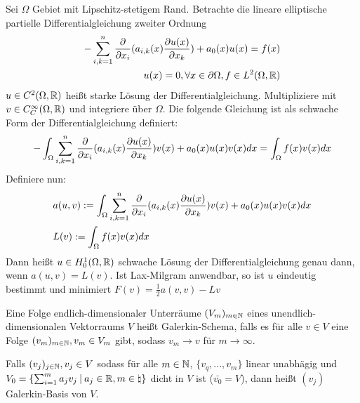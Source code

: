 \begin{satz}
	Sei $\Omega$ Gebiet mit Lipschitz-stetigem Rand. Betrachte die lineare elliptische partielle Differentialgleichung zweiter Ordnung
	\begin{align*}
		- \sum_{i,k = 1}^{n} \frac{\partial }{\partial x_i}(a_{i,k}(x) \frac{\partial u(x)}{\partial x_k}) + a_0(x)u(x) = f(x) \\
		u(x) = 0, \forall x \in \partial \Omega, f \in L^2(\Omega,\mathbb{R})
	\end{align*}
	$u \in C^{2}(\Omega,\mathbb{R})$ heißt starke Lösung der Differentialgleichung.
	Multipliziere mit $v \in C_C^\infty(\Omega,\mathbb{R})$ und integriere über $\Omega$. Die folgende Gleichung ist als schwache Form der Differentialgleichung definiert:
	\begin{align*}
		- \int_{\Omega} \sum_{i,k = 1}^{n} \frac{\partial }{\partial x_i}(a_{i,k}(x) \frac{\partial u(x)}{\partial x_k}) v(x) + a_0(x)u(x) v(x) dx = \int_\Omega f(x) v(x) dx
	\end{align*}
	Definiere nun:
	\begin{align*}
		&a(u,v) := \int_{\Omega} \sum_{i,k = 1}^{n} \frac{\partial }{\partial x_i}(a_{i,k}(x) \frac{\partial u(x)}{\partial x_k}) v(x) + a_0(x)u(x) v(x) dx \\
		&L(v) := \int_\Omega f(x)v(x) dx
	\end{align*}
	Dann heißt $u \in H^{1}_0(\Omega,\mathbb{R})$ schwache Lösung  der Differentialgleichung genau dann, wenn $a(u,v) = L(v)$. Ist Lax-Milgram anwendbar, so ist $u$ eindeutig bestimmt und minimiert $F(v) = \frac{1}{2} a(v,v) - Lv$
\end{satz}

\begin{definition}
	Eine Folge endlich-dimensionaler Unterräume $(V_{m})_{m \in \mathbb{N}}$ eines unendlich-dimensionalen Vektorraums $V$ heißt Galerkin-Schema, falls es für alle $v \in V$ eine Folge $(v_{m})_{m \in \mathbb{N}}, v_m \in V_m $ gibt, sodass $v_m \rightarrow v$ für $m \rightarrow \infty$. 
	
	Falls $(v_{j})_{j \in \mathbb{N}}, v_j \in V$ sodass für alle $m \in \mathbb{N}$, $\{v_q,...,v_m\}$ linear unabhägig und $V_0 = \{\sum_{i = 1}^m a_j v_j \medspace | \medspace a_j \in \mathbb{R}, m \in \natural\}$ dicht in $V$ ist ($\bar{v_0} = V$), dann heißt $(v_j)$ Galerkin-Basis von $V$.
\end{definition}

